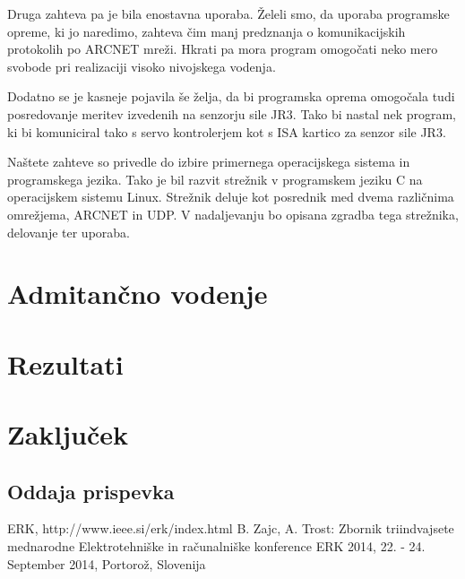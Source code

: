 \documentclass[a4paper]{article}
\begin{document}
Druga zahteva pa je bila enostavna uporaba. Želeli smo, da uporaba programske opreme, ki jo naredimo, zahteva čim manj predznanja o komunikacijskih protokolih po ARCNET mreži. Hkrati pa mora program omogočati neko mero svobode pri realizaciji visoko nivojskega vodenja.

Dodatno se je kasneje pojavila še želja, da bi programska oprema omogočala tudi posredovanje meritev izvedenih na senzorju sile JR3. Tako bi nastal nek program, ki bi komuniciral tako s servo kontrolerjem kot s ISA kartico za senzor sile JR3.

Naštete zahteve so privedle do izbire primernega operacijskega sistema in programskega jezika. Tako je bil razvit strežnik v programskem jeziku C na operacijskem sistemu Linux. Strežnik deluje kot posrednik med dvema različnima omrežjema, ARCNET in UDP.  V nadaljevanju bo opisana zgradba tega strežnika, delovanje ter uporaba.

\section{Admitančno vodenje}

\section{Rezultati}

\section{Zaključek}

\subsection{Oddaja prispevka}


\small
\begin{thebibliography}{1}

 ERK, http://www.ieee.si/erk/index.html 
 B. Zajc, A. Trost: Zbornik triindvajsete mednarodne Elektrotehniške in računalniške konference ERK 2014, 22. - 24. September 2014, Portorož, Slovenija

\end{thebibliography}
\end{document}

